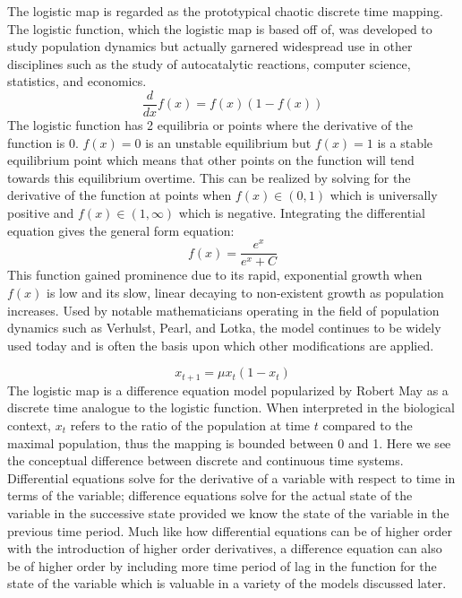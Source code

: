 The logistic map is regarded as the prototypical chaotic discrete time mapping. The logistic function, which the logistic map is based off of, was developed to study population dynamics but actually garnered widespread use in other disciplines such as the study of autocatalytic reactions, computer science, statistics, and economics\autocite{Kavanagh1934}.
\begin{equation}
    \frac{d}{dx}f(x)=f(x)(1-f(x))
\end{equation}
The logistic function has 2 equilibria or points where the derivative of the function is 0. $f(x) = 0$ is an unstable equilibrium but $f(x)=1$ is a stable equilibrium point which means that other points on the function will tend towards this equilibrium overtime.  This can be realized by solving for the derivative of the function at points when $f(x)\in(0,1)$ which is universally positive and $f(x)\in(1,\infty)$ which is negative. Integrating the differential equation gives the general form equation:
\begin{equation}
    f(x)=\frac{e^x}{e^x+C}
\end{equation}
This function gained prominence due to its rapid, exponential growth when $f(x)$ is low and its slow, linear decaying to non-existent growth as population increases.  Used by notable mathematicians operating in the field of population dynamics such as Verhulst, Pearl, and Lotka, the model continues to be widely used today and is often the basis upon which other modifications are applied\autocite{Zwanzig1973}.

\begin{equation}
    x_{t+1}=\mu x_t(1-x_t)
\end{equation}
The logistic map is a difference equation model popularized by Robert May as a discrete time analogue to the logistic function\autocite{May1976}. When interpreted in the biological context, $x_t$ refers to the ratio of the population at time $t$ compared to the maximal population, thus the mapping is bounded between 0 and 1. Here we see the conceptual difference between discrete and continuous time systems. Differential equations solve for the derivative of a variable with respect to time in terms of the variable; difference equations solve for the actual state of the variable in the successive state provided we know the state of the variable in the previous time period. Much like how differential equations can be of higher order with the introduction of higher order derivatives, a difference equation can also be of higher order by including more time period of lag in the function for the state of the variable which is valuable in a variety of the models discussed later.


